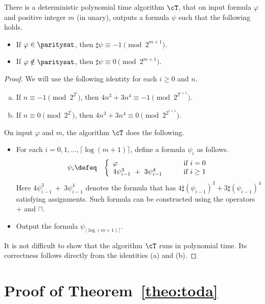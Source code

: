 \documentclass[11pt, a4paper]{article}
\begin{document}
\begin{lemma}
\label{lem:paritysat-sharpsat}
There is a deterministic polynomial time algorithm $\cT$, 
that on input formula $\varphi$ and positive integer $m$ (in unary),
outputs a formula $\psi$ such that the following holds.
\begin{itemize}
\item
If $\varphi \in \paritysat$, then $\sharp\psi \equiv -1 \pmod {2^{m+1}}$.
\item
If $\varphi \notin \paritysat$, then $\sharp\psi \equiv 0 \pmod {2^{m+1}}$.
\end{itemize} 
\end{lemma}
\begin{proof}
We will use the following identity for each $i\geq 0$ and $n$.
\begin{enumerate}[(a)]
\item
If $n \equiv -1 \pmod {2^{2^i}}$,
then $4n^3 + 3n^4 \equiv -1 \pmod{ 2^{2^{i+1}}}$.
\item
If $n \equiv 0 \pmod {2^{2^i}}$,
then $4n^3 + 3n^4 \equiv 0 \pmod{ 2^{2^{i+1}}}$.
\end{enumerate}
On input $\varphi$ and $m$,
the algorithm $\cT$ does the following.
\begin{itemize}
\item
For each $i=0,1,\ldots,\lceil\log (m+1)\rceil$,
define a formula $\psi_i$ as follows.
\begin{eqnarray*}
\psi_i & \defeq & 
\left\{
\begin{array}{ll}
\varphi & \text{if}\ i =0
\\
4\psi_{i-1}^3\ + \ 3 \psi_{i-1}^4 \qquad& \text{if}\ i \geq 1
\end{array}
\right.
\end{eqnarray*}
Here $4\psi_{i-1}^3\ + \ 3\psi_{i-1}^4$ denotes the formula
that has $4\sharp(\psi_{i-1})^3 + 3\sharp(\psi_{i-1})^4$ satisfying assignments.
Such formula can be constructed using the operators $+$ and $\sqcap$.
\item
Output the formula $\psi_{\lceil\log (m+1)\rceil}$.
\end{itemize}
It is not difficult to show that the algorithm $\cT$ runs in polynomial time.
Its correctness follows directly from the identities (a) and (b).
\end{proof}


\section{Proof of Theorem~\ref{theo:toda}}
\end{document}

